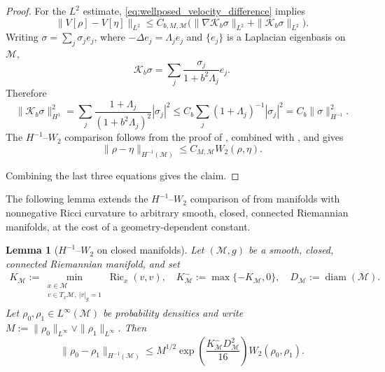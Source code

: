 \documentclass[11pt]{article}
\newtheorem{lemma}[theorem]{Lemma}
\theoremstyle{definition}
\newcommand{\Ric}{\operatorname{Ric}}
\def\M{\mathcal M}
\begin{document}
\begin{proof}
For the $L^2$ estimate, \eqref{eq:wellposed_velocity_difference} implies
\[
\|V[\rho]-V[\eta]\|_{L^2}
\le C_{b,M,\M}\bigl(\|\nabla \mathcal K_b\sigma\|_{L^2}+\|\mathcal K_b\sigma\|_{L^2}\bigr).
\]
Writing
\(\sigma=\sum_j\sigma_je_j\), where \(-\Delta e_j=\Lambda_je_j\) and
\(\{e_j\}\) is a  Laplacian eigenbasis on \(\M\),
\[
\mathcal K_b\sigma=\sum_j\frac{\sigma_j}{1+b^2\Lambda_j}e_j.
\]
Therefore
\[
\|\mathcal K_b\sigma\|_{H^1}^2
=
\sum_j
\frac{1+\Lambda_j}{(1+b^2\Lambda_j)^2}|\sigma_j|^2
\le
C_b\sum_j(1+\Lambda_j)^{-1}|\sigma_j|^2
=
C_b\|\sigma\|_{H^{-1}}^2.
\]
The \(H^{-1}\)--\(W_2\) comparison follows from the proof of
\cite[Theorem~5]{peyre2018comparison}, combined with \cite[Eq.~(3.2)]{ambrosio2014metric}, and gives 
\[
\|\rho-\eta\|_{H^{-1}( \M)}\le C_{M,\M}W_2(\rho,\eta).
\]


Combining the last three equations gives the claim.
\end{proof}



The following lemma extends the \(H^{-1}\)--\(W_2\) comparison of \cite[Theorem~5]{peyre2018comparison} from manifolds with nonnegative Ricci curvature to arbitrary smooth, closed, connected Riemannian manifolds, at the cost of a geometry-dependent constant.

\begin{lemma}[$H^{-1}$--$W_2$ on closed manifolds]
\label{lem:hminusone_wasserstein}
Let $(\M,g)$ be a smooth, closed, connected Riemannian manifold, and set
\begin{align*}
K_{\M}
:=
\min_{\substack{x\in\M\\ v\in T_x\M,\ |v|_g=1}}
\Ric_x(v,v),
\quad
K_{\M}^-:=\max\{-K_{\M},0\}, \quad
D_{\M}:=\operatorname{diam}(\M).
\end{align*}
Let $\rho_0,\rho_1\in L^\infty(\M)$ be probability densities and write
$M:=\|\rho_0\|_{L^\infty}\vee \|\rho_1\|_{L^\infty}$. 
Then
\begin{equation}
\label{eq:hminusone_wasserstein_uniform}
\|\rho_0-\rho_1\|_{H^{-1}(\M)}
\leq
M^{1/2}\exp\!\left(\frac{K_{\M}^-D_{\M}^2}{16}\right)
W_2(\rho_0,\rho_1).
\end{equation}
\end{lemma}
\end{document}
